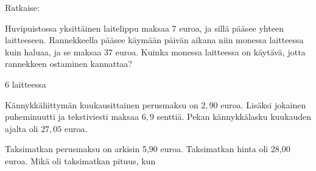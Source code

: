 \begin{tehtavasivu}
\begin{tehtava}
Ratkaise:
\begin{alakohdat}
\end{alakohdat}

\begin{vastaus}
\begin{alakohdat}
\end{alakohdat}
\end{vastaus}
\end{tehtava}


\begin{tehtava}
Huvipuistossa yksittäinen laitelippu maksaa 7 euroa, ja sillä pääsee yhteen laitteeseen. Rannekkeella pääsee käymään päivän aikana niin monessa laitteessa kuin haluaa, ja se maksaa 37 euroa. Kuinka monessa laitteessa on käytävä, jotta rannekkeen ostaminen kannattaa?
\begin{vastaus}
$6$ laitteessa
\end{vastaus}
\end{tehtava}

\begin{tehtava}
Kännykkäliittymän kuukausittainen perusmaksu on $2,90$ euroa. Lisäksi jokainen puheminuutti ja tekstiviesti maksaa $6,9$ senttiä. Pekan kännykkälasku kuukauden
ajalta oli $27,05$ euroa.

\begin{alakohdat}
\end{alakohdat}

	\begin{vastaus}
		\begin{alakohdat}
		\end{alakohdat}
	\end{vastaus}
\end{tehtava}

\begin{tehtava}
 Taksimatkan perusmaksu on arkisin 5,90 euroa. Taksimatkan hinta oli 28,00 euroa. Mikä oli taksimatkan pituus, kun
\begin{alakohdat}
\end{alakohdat}
	\begin{vastaus}
		\begin{alakohdat}
			\alakohta{14,5 kilometriä}
			\alakohta{10,4 kilometriä}
		\end{alakohdat}
	\end{vastaus}
\end{tehtava}



\end{tehtavasivu}
